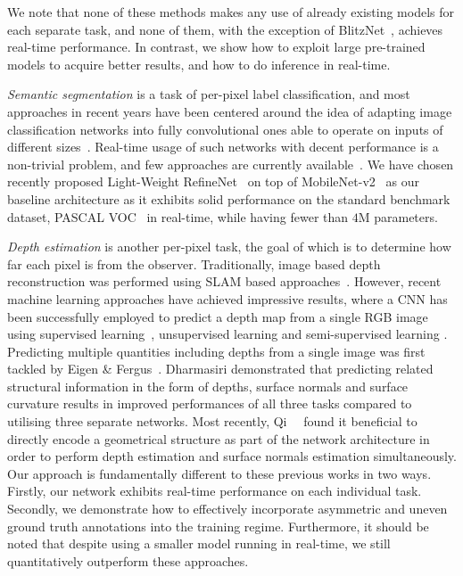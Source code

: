 \documentclass[letterpaper, 10 pt, conference]{ieeeconf}
\begin{document}
We note that none of these methods makes any use of already existing models for each separate task, and none of them, with the exception of BlitzNet~\cite{DvornikSMS17}, achieves real-time performance. In contrast, we show how to exploit large pre-trained models to acquire better results, and how to do inference in real-time.

{\em Semantic segmentation} is a task of per-pixel label classification, and most approaches in recent years have been centered around the idea of adapting image classification networks into fully convolutional ones able to operate on inputs of different sizes~\cite{LongSD15, WuSH16e, ChenPSA17}. Real-time usage of such networks with decent performance is a non-trivial problem, and few approaches are currently available~\cite{ZhaoQSSJ17, PaszkeCKC16, LiLLLT17, nekrasovlight}. We have chosen recently proposed Light-Weight RefineNet~\cite{nekrasovlight} on top of MobileNet-v2~\cite{abs-1801-04381} as our baseline architecture as it exhibits solid performance on the standard benchmark dataset, PASCAL VOC~\cite{EveringhamGWWZ10} in real-time, while having fewer than $4$M parameters.

{\em Depth estimation} is another per-pixel task, the goal of which is to determine how far each pixel is from the observer. Traditionally, image based depth reconstruction was performed using SLAM based approaches~\cite{Newcombe2011,engel2014lsd,klein2007parallel}. However, recent machine learning approaches have achieved impressive results, where a CNN has been successfully employed to predict a depth map from a single RGB image using supervised learning~\cite{EigenF15,EigenNIPS,Laina2016,Liu}, unsupervised learning \cite{garg2016unsupervised,godard2017unsupervised} and semi-supervised learning \cite{kuznietsov2017semi}. Predicting multiple quantities including depths from a single image was first tackled by Eigen \& Fergus~\cite{EigenF15}. Dharmasiri \etal\cite{dharmasiri2017joint} demonstrated that predicting related structural information in the form of depths, surface normals and surface curvature results in improved performances of all three tasks compared to utilising three separate networks. Most recently, Qi~\etal~\cite{qi2018geonet} found it beneficial to directly encode a geometrical structure as part of the network architecture in order to perform depth estimation and surface normals estimation simultaneously. Our approach is fundamentally different to these previous works in two ways. Firstly, our network exhibits real-time performance on each individual task. Secondly, we demonstrate how to effectively incorporate asymmetric and uneven ground truth annotations into the training regime. Furthermore, it should be noted that despite using a smaller model running in real-time, we still quantitatively outperform these approaches.
\end{document}
